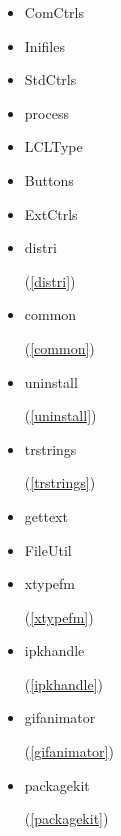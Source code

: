 \documentclass{report}
\begin{document}
\begin{itemize}
\item \begin{ttfamily}ComCtrls\end{ttfamily}\item \begin{ttfamily}Inifiles\end{ttfamily}\item \begin{ttfamily}StdCtrls\end{ttfamily}\item \begin{ttfamily}process\end{ttfamily}\item \begin{ttfamily}LCLType\end{ttfamily}\item \begin{ttfamily}Buttons\end{ttfamily}\item \begin{ttfamily}ExtCtrls\end{ttfamily}\item \begin{ttfamily}distri\end{ttfamily}(\ref{distri})\item \begin{ttfamily}common\end{ttfamily}(\ref{common})\item \begin{ttfamily}uninstall\end{ttfamily}(\ref{uninstall})\item \begin{ttfamily}trstrings\end{ttfamily}(\ref{trstrings})\item \begin{ttfamily}gettext\end{ttfamily}\item \begin{ttfamily}FileUtil\end{ttfamily}\item \begin{ttfamily}xtypefm\end{ttfamily}(\ref{xtypefm})\item \begin{ttfamily}ipkhandle\end{ttfamily}(\ref{ipkhandle})\item \begin{ttfamily}gifanimator\end{ttfamily}(\ref{gifanimator})\item \begin{ttfamily}packagekit\end{ttfamily}(\ref{packagekit})\end{itemize}
\end{document}
